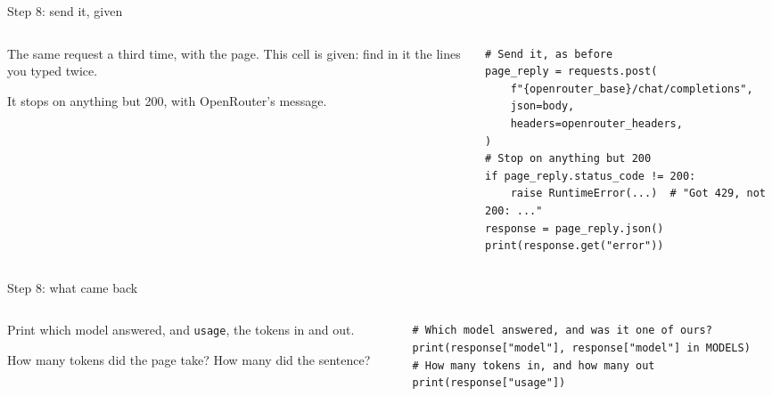 \documentclass[9pt,aspectratio=169]{beamer}
\begin{document}
\begin{frame}[fragile]{Step 8: send it, given}
    \begin{columns}[T]
        \begin{column}{0.37\textwidth}
            The same request a third time, with the page. This cell is given: find in it the lines you typed twice.

            \medskip
            It stops on anything but 200, with OpenRouter's message.
        \end{column}
        \begin{column}{0.6\textwidth}
\begin{lstlisting}
# Send it, as before
page_reply = requests.post(
    f"{openrouter_base}/chat/completions",
    json=body,
    headers=openrouter_headers,
)
# Stop on anything but 200
if page_reply.status_code != 200:
    raise RuntimeError(...)  # "Got 429, not 200: ..."
response = page_reply.json()
print(response.get("error"))
\end{lstlisting}
        \end{column}
    \end{columns}
\end{frame}

\begin{frame}[fragile]{Step 8: what came back}
    \begin{columns}[T]
        \begin{column}{0.37\textwidth}
            Print which model answered, and \texttt{usage}, the tokens in and out.

            \medskip
            How many tokens did the page take? How many did the sentence?
        \end{column}
        \begin{column}{0.6\textwidth}
\begin{lstlisting}
# Which model answered, and was it one of ours?
print(response["model"], response["model"] in MODELS)
# How many tokens in, and how many out
print(response["usage"])
\end{lstlisting}
        \end{column}
    \end{columns}
\end{frame}
\end{document}
